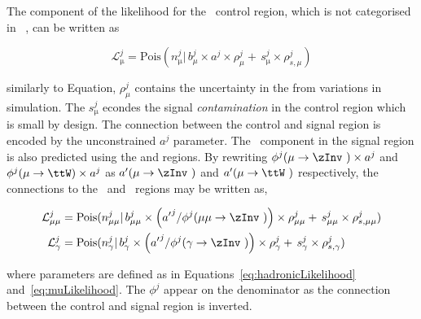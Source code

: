 The component of the likelihood for the \mj~control region, which is not categorised in \mht~, can be written as

\begin{equation}
\label{eq:muLikelihood}
\mathcal{L}^{j}_{\mathrm{\mu}} = \mathrm{Pois}(n^{j}_{\mathrm{\mu}} |\, b^{j}_{\mu}\times a^{j}\times\rho^{j}_{\mu} + \,s^{j}_{\mathrm{\mu}}\times\rho^{j}_{s,\mu})
\end{equation}

similarly to Equation, $\rho^{j}_{\mu}$ contains the uncertainty in the \htcat from variations in simulation. The $s^{j}_{\mathrm{\mu}}$
econdes the signal \emph{contamination} in the control region which is small by design. The connection between the control and signal region
is encoded by the unconstrained $a^{j}$ parameter. The \zInv~component in the signal 
region is also predicted using the \gj and \mmj regions. By rewriting $\phi^{j}(\mu\rightarrow\zInv~)\times a^{j}$ and $\phi^{j}(\mu\rightarrow\ttW)\times a^{j}$
as ${a'}(\mu\rightarrow\zInv~)$ and $a'(\mu\rightarrow\ttW~)$ respectively, the connections to the \gj~and \mmj~regions
may be written as, 

\begin{align}
\label{eq:mumuLikelihood}
\mathcal{L}^{j}_{\mathrm{\mu\mu}} &= \mathrm{Pois}(n^{j}_{\mathrm{\mu\mu}} |\, b^{j}_{\mu\mu}\times \left({a'}^{j}/\phi^{j}(\mu\mu\rightarrow\zInv~)\right)\times\rho^{j}_{\mu\mu} + \,s^{j}_{\mathrm{\mu\mu}}\times\rho^{j}_{s,\mu\mu}) \\
\mathcal{L}^{j}_{\mathrm{\gamma}} &= \mathrm{Pois}(n^{j}_{\mathrm{\gamma}} |\, b^{j}_{\gamma}\times \left({a'}^{j}/\phi^{j}(\gamma\rightarrow\zInv~)\right)\times\rho^{j}_{\gamma} + \,s^{j}_{\mathrm{\gamma}}\times\rho^{j}_{s,\gamma})
\end{align}

where parameters are defined as in Equations~\ref{eq:hadronicLikelihood} and~\ref{eq:muLikelihood}. 
The $\phi^{j}$ appear on the denominator as the connection between the control and signal region is 
inverted.

